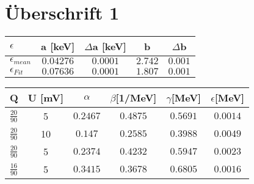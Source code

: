 \documentclass[ngerman]{scrartcl} %
\begin{document}
 \section{Überschrift 1}         %
 \label{sec:uberschrift-1}       %
 \LaTeXe{}
 \begin{table}

 \begin{tabular}{ l|c|c|c|c}
    \hline
 $\epsilon$& a [keV]&$\Delta$a [keV] &b &$\Delta$b \\
 \hline
 $\epsilon_{mean}$&$0.04276$ &$0.0001$ &$2.742$ &$0.001$ \\
 \hline
 $\epsilon_{Fit}$&$0.07636$ &$0.0001$ &$1.807$ &$0.001$ \\
\end{tabular}
\end{table}

\begin{table}
	\begin{tabular}{ l|c|c|c |c |c}
		Q&U [mV]&$\alpha$ &$\beta  $[1/MeV] &$\gamma $[MeV] &$\epsilon $[MeV]  \\ 
		\hline
		
		$\frac{20}{90}$ &5 &$0.2467$  &$0.4875$ & $0.5691$&$0.0014$  \\
		\hline
		$\frac{20}{90}$ &10 &$0.147$ &$0.2585$ &$0.3988$ &$0.0049$  \\
		\hline
		$\frac{20}{90}$ &5 &$0.2374$ &$0.4232$ &$0.5947$ &$0.0023$  \\
		\hline
		$\frac{16}{90}$ &5 &$0.3415$ &$0.3678$ &$0.6805$ &$0.0016$  \\
		\hline
	\end{tabular}
\end{table}
\end{document}

